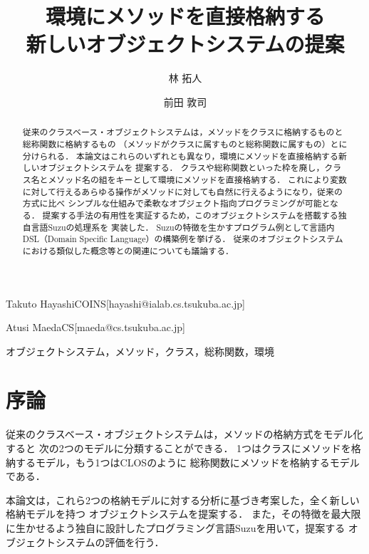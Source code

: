 \documentclass{ipsjprosym}
\begin{document}
\title{環境にメソッドを直接格納する \\ 新しいオブジェクトシステムの提案}


\author{林 拓人}{Takuto Hayashi}{COINS}[hayashi@ialab.cs.tsukuba.ac.jp]
\author{前田 敦司}{Atusi Maeda}{CS}[maeda@cs.tsukuba.ac.jp]

\begin{abstract}
従来のクラスベース・オブジェクトシステムは，メソッドをクラスに格納するものと総称関数に格納するもの
（メソッドがクラスに属すものと総称関数に属すもの）とに分けられる．
本論文はこれらのいずれとも異なり，環境にメソッドを直接格納する新しいオブジェクトシステムを
提案する．
クラスや総称関数といった枠を廃し，クラス名とメソッド名の組をキーとして環境にメソッドを直接格納する．
これにより変数に対して行えるあらゆる操作がメソッドに対しても自然に行えるようになり，従来の方式に比べ
シンプルな仕組みで柔軟なオブジェクト指向プログラミングが可能となる．
提案する手法の有用性を実証するため，このオブジェクトシステムを搭載する独自言語Suzuの処理系を
実装した．
Suzuの特徴を生かすプログラム例として言語内DSL（Domain Specific Language）の構築例を挙げる．
従来のオブジェクトシステムにおける類似した概念等との関連についても議論する．
\end{abstract}

\begin{jkeyword}
オブジェクトシステム，メソッド，クラス，総称関数，環境
\end{jkeyword}

\maketitle

\section{序論}

従来のクラスベース・オブジェクトシステムは，メソッドの格納方式をモデル化すると
次の2つのモデルに分類することができる．
1つはクラスにメソッドを格納するモデル，もう1つはCLOS\cite{Ida:2010}のように
総称関数にメソッドを格納するモデルである．

本論文は，これら2つの格納モデルに対する分析に基づき考案した，全く新しい格納モデルを持つ
オブジェクトシステムを提案する．
また，その特徴を最大限に生かせるよう独自に設計したプログラミング言語Suzuを用いて，提案する
オブジェクトシステムの評価を行う．
\end{document}
